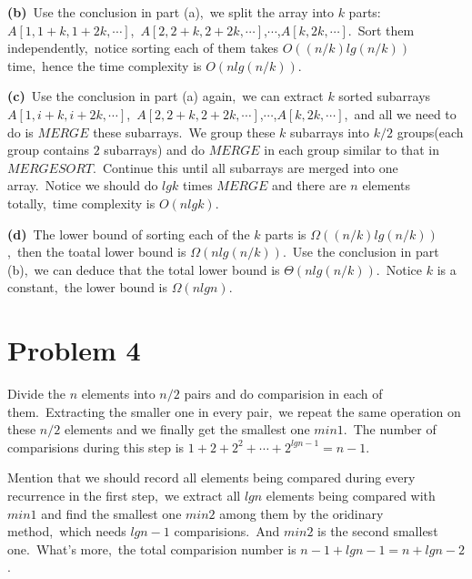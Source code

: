\documentclass[]{article}
\begin{document}
	\textbf{(b)}\ Use the conclusion in part (a),\ we split the array into $k$ parts:\ $A[1,1+k,1+2k,\cdots]$,\ $A[2,2+k,2+2k,\cdots]$,$\cdots$,$A[k,2k,\cdots]$.\ Sort them independently,\ notice sorting each of them takes $O((n/k)lg(n/k))$ time,\ hence the time complexity is $O(nlg(n/k))$.
	
	\textbf{(c)}\ Use the conclusion in part (a) again,\ we can extract $k$ sorted subarrays $A[1,i+k,i+2k,\cdots]$,\ $A[2,2+k,2+2k,\cdots]$,$\cdots$,$A[k,2k,\cdots]$,\ and all we need to do is $MERGE$ these subarrays.\ We group these $k$ subarrays into $k/2$ groups(each group contains $2$ subarrays) and do $MERGE$ in each group similar to that in $MERGESORT$.\ Continue this until all subarrays are merged into one array.\ Notice we should do $lgk$ times $MERGE$ and there are $n$ elements totally,\ time complexity is $O(nlgk)$.
	
	\textbf{(d)}\ The lower bound of sorting each of the $k$ parts is $\Omega((n/k)lg(n/k))$,\ then the toatal lower bound is $\Omega(nlg(n/k))$.\ Use the conclusion in part (b),\ we can deduce that the total lower bound is $\Theta(nlg(n/k))$.\ Notice $k$ is a constant,\ the lower bound is $\Omega(nlgn)$.
	
	\section{Problem 4}
	Divide the $n$ elements into $n/2$ pairs and do comparision in each of them.\ Extracting the smaller one in every pair,\ we repeat the same operation on these $n/2$ elements and we finally get the smallest one $min1$.\ The number of comparisions during this step is $1+2+2^2+\cdots+2^{lgn-1} = n - 1$.
	
	Mention that we should record all elements being compared during every recurrence in the first step,\ we extract all $lgn$ elements being compared with $min1$ and find the smallest one $min2$ among them by the oridinary method,\ which needs $lgn - 1$ comparisions.\ And $min2$ is the second smallest one.\ What's more,\ the total comparision number is $n - 1 + lgn - 1 = n + lgn -2$.
	
\end{document}
